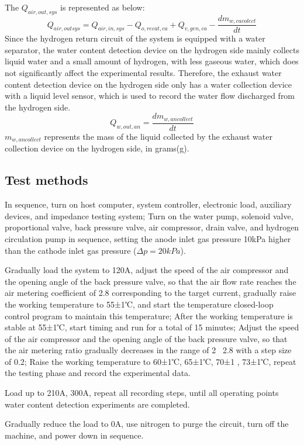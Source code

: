 The $Q_{air,out,sys}$ is represented as below:
\begin{equation}
\label{airFlowOutOfTheSystem}
Q_{air,outsys}=Q_{air,in,sys}-Q_{o,recat,ca}+Q_{v,gen,ca}-{\frac{dm_{w,cacolect}}{dt}}
\end{equation}
Since the hydrogen return circuit of the system is equipped with a water separator, the water content detection device on the hydrogen side mainly collects liquid water and a small amount of hydrogen, with less gaseous water, which does not significantly affect the experimental results. Therefore, the exhaust water content detection device on the hydrogen side only has a water collection device with a liquid level sensor, which is used to record the water flow discharged from the hydrogen side.
\begin{equation}
	Q_{w,out,an}={\frac{dm_{w,ancollect}}{dt}}
\end{equation}
$m_{w,ancollect}$ represents the mass of the liquid collected by the exhaust water collection device on the hydrogen side, in grams(g).

\subsection*{Test methods}
In sequence, turn on host computer, system controller, electronic load, auxiliary devices, and impedance testing system; Turn on the water pump, solenoid valve, proportional valve, back pressure valve, air compressor, drain valve, and hydrogen circulation pump in sequence, setting the anode inlet gas pressure 10kPa higher than the cathode inlet gas pressure ($\Delta p=20kPa$). 
\par
Gradually load the system to 120A, adjust the speed of the air compressor and the opening angle of the back pressure valve, so that the air flow rate reaches the air metering coefficient of 2.8 corresponding to the target current, gradually raise the working temperature to 55±1℃, and start the temperature closed-loop control program to maintain this temperature; After the working temperature is stable at 55±1℃, start timing and run for a total of 15 minutes; Adjust the speed of the air compressor and the opening angle of the back pressure valve, so that the air metering ratio gradually decreases in the range of 2 ~2.8 with a step size of 0.2; Raise the working temperature to 60±1℃, 65±1℃, 70±1 , 73±1℃, repeat the testing phase and record the experimental data.
\par
Load up to 210A, 300A, repeat all recording steps, until all operating points water content detection experiments are completed.
\par
Gradually reduce the load to 0A, use nitrogen to purge the circuit, turn off the machine, and power down in sequence.